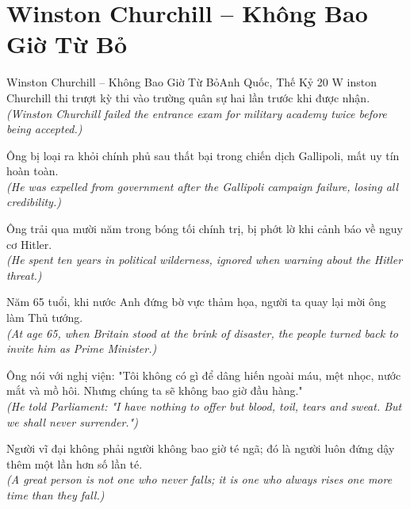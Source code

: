 \section{Winston Churchill -- Không Bao Giờ Từ Bỏ}
\begin{truyen}{Winston Churchill -- Không Bao Giờ Từ Bỏ}{Anh Quốc, Thế Kỷ 20}
W inston Churchill thi trượt kỳ thi vào trường quân sự hai lần trước khi được nhận.\\
\textit{(Winston Churchill failed the entrance exam for military academy twice before being accepted.)}

Ông bị loại ra khỏi chính phủ sau thất bại trong chiến dịch Gallipoli, mất uy tín hoàn toàn.\\
\textit{(He was expelled from government after the Gallipoli campaign failure, losing all credibility.)}

Ông trải qua mười năm trong bóng tối chính trị, bị phớt lờ khi cảnh báo về nguy cơ Hitler.\\
\textit{(He spent ten years in political wilderness, ignored when warning about the Hitler threat.)}

Năm 65 tuổi, khi nước Anh đứng bờ vực thảm họa, người ta quay lại mời ông làm Thủ tướng.\\
\textit{(At age 65, when Britain stood at the brink of disaster, the people turned back to invite him as Prime Minister.)}

Ông nói với nghị viện: "Tôi không có gì để dâng hiến ngoài máu, mệt nhọc, nước mắt và mồ hôi. Nhưng chúng ta sẽ không bao giờ đầu hàng."\\
\textit{(He told Parliament: "I have nothing to offer but blood, toil, tears and sweat. But we shall never surrender.")}

\end{truyen}
\begin{baihoc}
  Người vĩ đại không phải người không bao giờ té ngã; đó là người luôn đứng dậy thêm một lần hơn số lần té.\\
  \textit{(A great person is not one who never falls; it is one who always rises one more time than they fall.)}
\end{baihoc}


